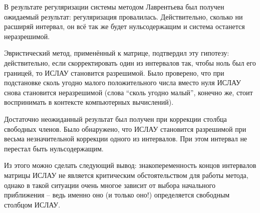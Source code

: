 В результате регуляризации системы методом Лаврентьева был получен ожидаемый результат: регуляризация провалилась. Действительно, сколько ни расширяй интервал, он всё так же будет нульсодержащим и система останется неразрешимой.

Эвристический метод, применённый к матрице, подтвердил эту гипотезу: действительно, если  скорректировать один из интервалов так, чтобы ноль был его границей, то ИСЛАУ становится разрешимой. Было проверено, что при подстановке сколь угодно малого положительного числа вместо нуля ИСЛАУ снова становится неразрешимой (слова ``сколь угодно малый'', конечно же, стоит воспринимать в контексте компьютерных вычислений).

Достаточно неожиданный результат был получен при коррекции столбца свободных членов. Было обнаружено, что ИСЛАУ становится разрешимой при весьма незначительной коррекции одного из интервалов. При этом интервал не перестал быть нульсодержащим.

Из этого можно сделать следующий вывод: знакопеременность концов интервалов матрицы ИСЛАУ не является критическим обстоятельством для работы метода, однако в такой ситуации очень многое зависит от выбора начального приближения -- ведь именно оно (и только оно!) определяется свободным столбцом ИСЛАУ.